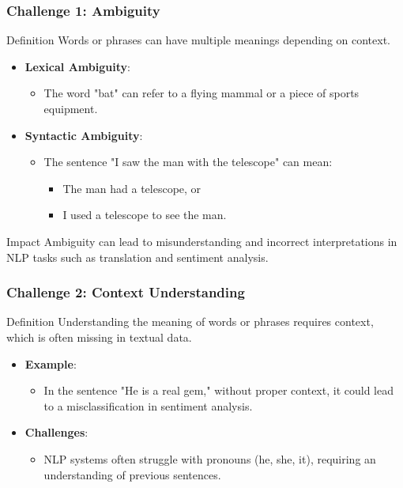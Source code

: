 \documentclass[aspectratio=169]{beamer}
\begin{document}
\begin{frame}[fragile]
    \frametitle{Challenge 1: Ambiguity}
    \begin{block}{Definition}
        Words or phrases can have multiple meanings depending on context.
    \end{block}

    \begin{itemize}
        \item \textbf{Lexical Ambiguity}: 
        \begin{itemize}
            \item The word "bat" can refer to a flying mammal or a piece of sports equipment.
        \end{itemize}

        \item \textbf{Syntactic Ambiguity}:
        \begin{itemize}
            \item The sentence "I saw the man with the telescope" can mean:
            \begin{itemize}
                \item The man had a telescope, or
                \item I used a telescope to see the man.
            \end{itemize}
        \end{itemize}
    \end{itemize}

    \begin{block}{Impact}
        Ambiguity can lead to misunderstanding and incorrect interpretations in NLP tasks such as translation and sentiment analysis.
    \end{block}
\end{frame}

\begin{frame}[fragile]
    \frametitle{Challenge 2: Context Understanding}
    \begin{block}{Definition}
        Understanding the meaning of words or phrases requires context, which is often missing in textual data.
    \end{block}

    \begin{itemize}
        \item \textbf{Example}:
        \begin{itemize}
            \item In the sentence "He is a real gem," without proper context, it could lead to a misclassification in sentiment analysis.
        \end{itemize}

        \item \textbf{Challenges}:
        \begin{itemize}
            \item NLP systems often struggle with pronouns (he, she, it), requiring an understanding of previous sentences.
        \end{itemize}
    \end{itemize}
\end{frame}
\end{document}
